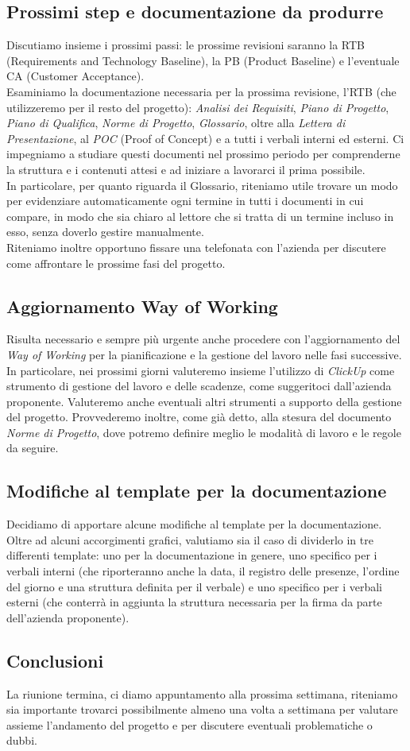 \documentclass[italian,12pt]{article} %
\begin{document}
\subsection{Prossimi step e documentazione da produrre}
Discutiamo insieme i prossimi passi: le prossime revisioni saranno la RTB 
(Requirements and Technology Baseline), la PB (Product Baseline) e l'eventuale CA 
(Customer Acceptance).\\
Esaminiamo la documentazione necessaria per la prossima revisione, l'RTB (che 
utilizzeremo per il resto del progetto): \textit{Analisi dei Requisiti}, 
\textit{Piano di Progetto}, \textit{Piano di Qualifica}, \textit{Norme di Progetto}, 
\textit{Glossario},  oltre alla \textit{Lettera di Presentazione}, al \textit{POC} 
(Proof of Concept) e a tutti i verbali interni ed esterni. Ci impegniamo a studiare 
questi documenti nel prossimo periodo per comprenderne la struttura e i contenuti 
attesi e ad iniziare a lavorarci il prima possibile. \\
In particolare, per quanto riguarda il Glossario, riteniamo utile trovare un modo 
per evidenziare automaticamente ogni termine in tutti i documenti in cui compare, 
in modo che sia chiaro al lettore che si tratta di un termine incluso in esso, 
senza doverlo gestire manualmente. \\
Riteniamo inoltre opportuno fissare una telefonata con l'azienda per discutere 
come affrontare le prossime fasi del progetto.

\subsection{Aggiornamento Way of Working}
Risulta necessario e sempre più urgente anche procedere con l'aggiornamento del 
\textit{Way of Working} per la pianificazione e la gestione del lavoro nelle fasi 
successive. \\
In particolare, nei prossimi giorni valuteremo insieme l'utilizzo di \textit{ClickUp} 
come strumento di gestione del lavoro e delle scadenze, come suggeritoci 
dall'azienda proponente. Valuteremo anche eventuali altri strumenti a supporto della 
gestione del progetto. Provvederemo inoltre, come già detto, alla stesura del 
documento \textit{Norme di Progetto}, dove potremo definire meglio le modalità di 
lavoro e le regole da seguire.

\subsection{Modifiche al template per la documentazione}
Decidiamo di apportare alcune modifiche al template per la documentazione. \\
Oltre ad alcuni accorgimenti grafici, valutiamo sia il caso di dividerlo 
in tre differenti template: uno per la documentazione in genere, uno specifico per i verbali interni (che riporteranno anche la data, il registro delle presenze, l'ordine del giorno e una struttura definita per il verbale) e uno specifico per i verbali esterni (che conterrà in aggiunta la struttura necessaria per la firma da parte dell'azienda proponente).

\subsection{Conclusioni}
La riunione termina, ci diamo appuntamento alla prossima settimana, riteniamo sia 
importante trovarci possibilmente almeno una volta a settimana per valutare assieme 
l'andamento del progetto e per discutere eventuali problematiche o dubbi.
\end{document}
